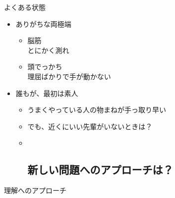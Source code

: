 \begin{frame}

\begin{block}{よくある状態}

\begin{itemize}

\item
  ありがちな両極端

  \begin{itemize}
  
  \item
    脳筋\\
    とにかく測れ
  \item
    頭でっかち\\
    理屈ばかりで手が動かない
  \end{itemize}
\item
  誰もが、最初は素人

  \begin{itemize}
  \item
    うまくやっている人の物まねが手っ取り早い
  \item
    でも、近くにいい先輩がいないときは？
  \item ~
    \subsection{新しい問題へのアプローチは？}
  \end{itemize}
\end{itemize}

\end{block}

\begin{block}{理解へのアプローチ}

\end{block}

\end{frame}

